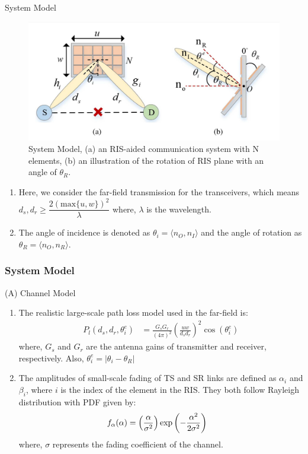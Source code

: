 \documentclass{beamer}
\begin{document}
\begin{frame}{System Model}
    \begin{figure}
        \centering
        \includegraphics[scale = 0.125]{figures/system_model.jpg}
        \caption{System Model, (a) an RIS-aided communication system with N elements, (b) an illustration of the rotation of RIS plane with an angle of $\theta_R$.}
        \label{fig:system_model}
    \end{figure}
    \begin{enumerate}
        \item Here, we consider the far-field transmission for the transceivers, which means $d_s, d_r \geq \dfrac{2(\text{max}\{u,w\})^2}{\lambda}$ where, $\lambda$ is the wavelength.
        \item The angle of incidence is denoted as $\theta_i = \langle n_O, n_I\rangle$ and the angle of rotation as $\theta_R = \langle n_O, n_R\rangle$.
    \end{enumerate}
\end{frame}
\begin{frame}
\frametitle{System Model}
    \begin{block}{(A) Channel Model}
      \begin{enumerate}
        \item The realistic large-scale path loss model used in the far-field is: 
        \begin{align}
            P_l(d_s,d_r,\theta_i^e) &= \frac{G_s G_r}{(4\pi)^2}\left(\frac{u w}{d_s d_r}\right)^2\cos(\theta_i^e)
        \end{align}
        where, $G_s$ and $G_r$ are the antenna gains of transmitter and receiver, respectively. Also,  $\theta_i^e = |\theta_i - \theta_R|$
        \item The amplitudes of small-scale fading of TS and SR links are defined as $\alpha_i$ and $\beta_i$, where $i$ is the index of the element in the RIS. They both follow Rayleigh distribution with PDF given by:
        \begin{align}
            \mathnormal{f}_{\alpha}(\alpha) &= \left(\frac{\alpha}{\sigma^2}\right)\text{exp}\left(-\dfrac{\alpha^2}{2\sigma^2}\right)
        \end{align}
        where, $\sigma$ represents the fading coefficient of the channel.
      \end{enumerate}
    \end{block}
\end{frame}
\end{document}

